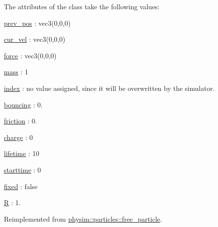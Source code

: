 The attributes of the class take the following values\+:
\begin{DoxyItemize}
\item \hyperlink{classphysim_1_1particles_1_1base__particle_a08072db6a1a59d21acc9cac6ac8965f7}{prev\+\_\+pos} \+: vec3(0,0,0)
\item \hyperlink{classphysim_1_1particles_1_1base__particle_a66a164d2a130c40901e3ec2709cdad43}{cur\+\_\+vel} \+: vec3(0,0,0)
\item \hyperlink{classphysim_1_1particles_1_1base__particle_adc3b11899d2e50970ae5d4931721a0ef}{force} \+: vec3(0,0,0)
\item \hyperlink{classphysim_1_1particles_1_1base__particle_acb5c9f0b4a911d8981210e2cfc4dda8a}{mass} \+: 1
\item \hyperlink{classphysim_1_1particles_1_1base__particle_a44f5de3bb4b860dfd511e28e1d6519d5}{index} \+: no value assigned, since it will be overwritten by the simulator.
\item \hyperlink{classphysim_1_1particles_1_1free__particle_aac766fa5294e47b944d32ca3e38d47fa}{bouncing} \+: 0.
\item \hyperlink{classphysim_1_1particles_1_1free__particle_a9e7dfd81e9392fc42b3faecb57afdc02}{friction} \+: 0.
\item \hyperlink{classphysim_1_1particles_1_1free__particle_a7513ac41f3cab1ce083f8695e2c73301}{charge} \+: 0
\item \hyperlink{classphysim_1_1particles_1_1free__particle_a5870d6fd3167d2c6120f887f45fe50fc}{lifetime} \+: 10
\item \hyperlink{classphysim_1_1particles_1_1free__particle_ad0379ba926ecc909bfbfb373045bfcf9}{starttime} \+: 0
\item \hyperlink{classphysim_1_1particles_1_1free__particle_a0f6d69caeac140abd74c7be4ed55eb74}{fixed} \+: false
\item \hyperlink{classphysim_1_1particles_1_1sized__particle_ac67d5df84b91bb12152c8691dd43e98c}{R} \+: 1. 
\end{DoxyItemize}

Reimplemented from \hyperlink{classphysim_1_1particles_1_1free__particle_a0df21e64a28c5fdf471d54a50b59fea3}{physim\+::particles\+::free\+\_\+particle}.

\mbox{\label{classphysim_1_1particles_1_1sized__particle_a30eee2e3b0c0cf9e6f56a21e10a424f3}} 
